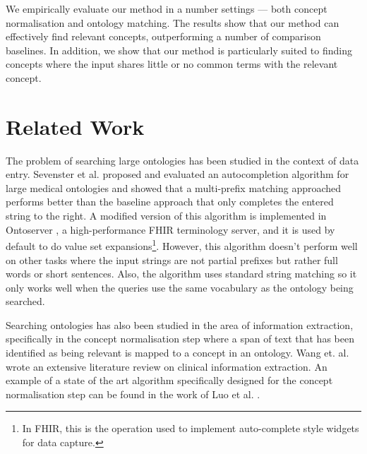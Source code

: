 \documentclass[preprint,12pt]{elsarticle}
\begin{document}
We empirically evaluate our method in a number settings --- both concept normalisation and ontology matching. The results show that our method can effectively find relevant concepts, outperforming a number of comparison baselines. In addition, we show that our method is particularly suited to finding concepts where the input shares little or no common terms with the relevant concept. 

\section*{Related Work}
\label{sec:RelatedWorks}

The problem of searching large ontologies has been studied in the context of data entry. Sevenster et al. \cite{sevenster2012} proposed and evaluated an autocompletion algorithm for large medical ontologies and showed that a multi-prefix matching approached performs better than the baseline approach that only completes the entered string to the right. A modified version of this algorithm is implemented in Ontoserver \cite{metke2018}, a high-performance FHIR terminology server, and it is used by default to do value set expansions\footnote{In FHIR, this is the operation used to implement auto-complete style widgets for data capture.}. However, this algorithm doesn't perform well on other tasks where the input strings are not partial prefixes but rather full words or short sentences. Also, the algorithm uses standard string matching so it only works well when the queries use the same vocabulary as the ontology being searched.

Searching ontologies has also been studied in the area of information extraction, specifically in the concept normalisation step where a span of text that has been identified as being relevant is mapped to a concept in an ontology. Wang et. al. \cite{wang2018} wrote an extensive literature review on clinical information extraction. An example of a state of the art algorithm specifically designed for the concept normalisation step can be found in the work of Luo et al. \cite{luo2019}. %
\end{document}
